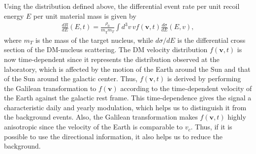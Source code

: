 \documentclass[12pt,twoside,book]{article}
\begin{document}
Using the distribution defined above, the differential event rate per unit recoil energy $E$ per unit material mass is given by \cite{Lewin:1995rx}
\begin{align}
  \frac{d R}{d E} (E,t) = \frac{\rho_0}{m_\chi m_T} \int d^3 v\, v f(\bm{v}, t)
  \frac{d \sigma}{d E} (E, v),
  \label{eq:rate}
\end{align}
where $m_T$ is the mass of the target nucleus, while $d\sigma / dE$ is the differential cross section of the DM-nucleus scattering.
The DM velocity distribution $f(\bm{v}, t)$ is now time-dependent since it represents the distribution observed at the laboratory, which is affected by the motion of the Earth around the Sun and that of the Sun around the galactic center.
Thus, $f(\bm{v}, t)$ is derived by performing the Galilean transformation to $f(\bm{v})$ according to the time-dependent velocity of the Earth against the galactic rest frame.
This time-dependence gives the signal a characteristic daily and yearly modulation, which helps us to distinguish it from the background events.
Also, the Galilean transformation makes $f(\bm{v}, t)$ highly anisotropic since the velocity of the Earth is comparable to $v_c$.
Thus, if it is possible to use the directional information, it also helps us to reduce the background.
\end{document}
